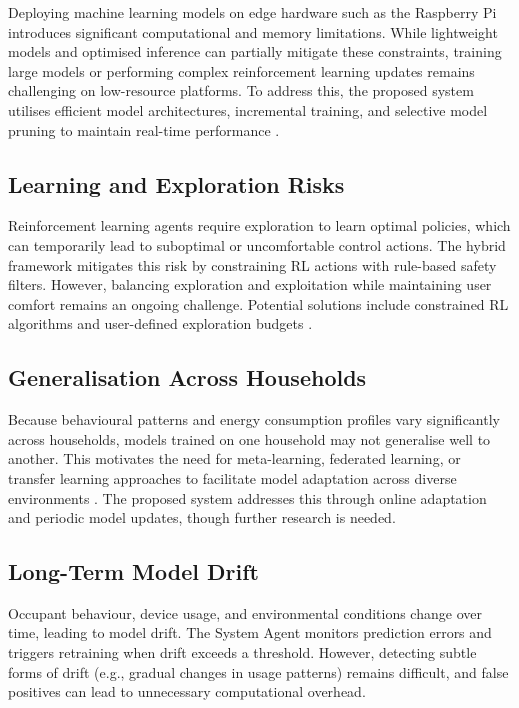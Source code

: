 \documentclass[11pt,a4paper]{article}
\begin{document}
Deploying machine learning models on edge hardware such as the Raspberry Pi introduces significant computational and memory limitations. While lightweight models and optimised inference can partially mitigate these constraints, training large models or performing complex reinforcement learning updates remains challenging on low-resource platforms. To address this, the proposed system utilises efficient model architectures, incremental training, and selective model pruning to maintain real-time performance \cite{han2015deep, liu2018darts}.

\subsection{Learning and Exploration Risks}

Reinforcement learning agents require exploration to learn optimal policies, which can temporarily lead to suboptimal or uncomfortable control actions. The hybrid framework mitigates this risk by constraining RL actions with rule-based safety filters. However, balancing exploration and exploitation while maintaining user comfort remains an ongoing challenge. Potential solutions include constrained RL algorithms and user-defined exploration budgets \cite{garcia2015comprehensive}.

\subsection{Generalisation Across Households}

Because behavioural patterns and energy consumption profiles vary significantly across households, models trained on one household may not generalise well to another. This motivates the need for meta-learning, federated learning, or transfer learning approaches to facilitate model adaptation across diverse environments \cite{dincecco2020transfer}. The proposed system addresses this through online adaptation and periodic model updates, though further research is needed.

\subsection{Long-Term Model Drift}

Occupant behaviour, device usage, and environmental conditions change over time, leading to model drift. The System Agent monitors prediction errors and triggers retraining when drift exceeds a threshold. However, detecting subtle forms of drift (e.g., gradual changes in usage patterns) remains difficult, and false positives can lead to unnecessary computational overhead.
\end{document}
